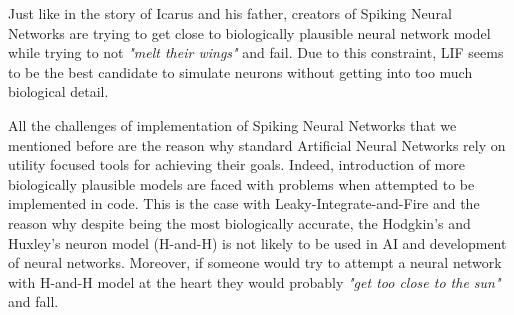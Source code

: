 Just like in the story of Icarus and his father, creators of Spiking Neural Networks are trying to get close to biologically plausible neural network model while trying to not \textit{"melt their wings"} and fail. Due to this constraint, LIF seems to be the best candidate to simulate neurons without getting into too much biological detail.

All the challenges of implementation of Spiking Neural Networks that we mentioned before are the reason why standard Artificial Neural Networks rely on utility focused tools for achieving their goals. Indeed, introduction of more biologically plausible models are faced with problems when attempted to be implemented in code. This is the case with Leaky-Integrate-and-Fire and the reason why despite being the most biologically accurate, the Hodgkin's and Huxley's neuron model (H-and-H) is not likely to be used in AI and development of neural networks. Moreover, if someone would try to attempt a neural network with H-and-H model at the heart they would probably \textit{"get too close to the sun"} and fall.